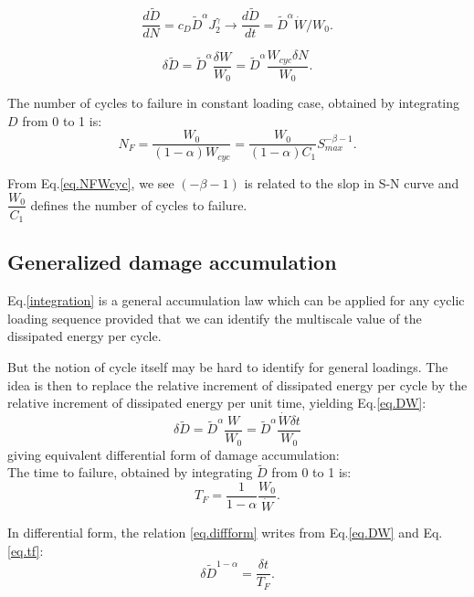 \documentclass[3p,times,number,review]{elsarticle}
\begin{document}
$$
\dfrac{d\tilde{D}}{dN} =c_D {\tilde{D}}^\alpha J_2^\gamma \to \dfrac{d\tilde{D}}{dt} ={\tilde{D}}^\alpha \dot{W}/W_0.
$$

\begin{equation}
\delta \tilde{D}=\tilde{D}^\alpha\dfrac{\delta W}{W_0}=\tilde{D}^\alpha\dfrac{W_{cyc}\delta N}{W_0}.
\label{eq.DWcyc}
\end{equation}

The number of cycles to failure in constant loading case, obtained by integrating $D$ from 0 to 1 is:
\begin{equation}
N_F=\dfrac{W_0}{\left( 1-\alpha\right)W_{cyc} }=\dfrac{W_0}{\left( 1-\alpha\right)C_1}S_{max}^{-\beta-1}.
\label{eq.NFWcyc}
\end{equation}
 
From Eq.\eqref{eq.NFWcyc}, we see $(-\beta-1)$ is related to the slop in S-N curve and $\dfrac{W_0}{C_1}$ defines the number of cycles to failure.
 
 
\subsection{Generalized damage accumulation}
Eq.\eqref{integration} is a general accumulation law which can be applied for any cyclic loading sequence provided that we can identify the multiscale value of the dissipated energy per cycle. 

But the notion of cycle itself may be hard to identify for general loadings. The idea is then to replace the relative increment of dissipated energy per cycle by the relative increment of dissipated energy per unit time, yielding Eq.\eqref{eq.DW}:
\begin{equation}
\delta\tilde{D}= \tilde{D}^\alpha \dfrac{W}{W_0} = \tilde{D}^\alpha \dfrac{\dot{W}\delta t}{W_0}
\label{eq.DW}
\end{equation}
giving equivalent differential form of damage accumulation:
\begin{equation}
\label{eq.DW2}
\end{equation}
The time to failure, obtained by integrating $\tilde{D}$ from 0 to 1 is:
\begin{equation}
T_F = \frac{1}{1-\alpha}\dfrac{W_0}{\dot{W}}.
\label{eq.tf}
\end{equation}

In differential form, the relation \eqref{eq.diffform} writes from Eq.\eqref{eq.DW} and Eq.\eqref{eq.tf}:
\begin{equation}
\delta \tilde{D}^{1-\alpha}=\frac{\delta t}{T_F}.
\label{eq.diffform}
\end{equation}
\end{document}
